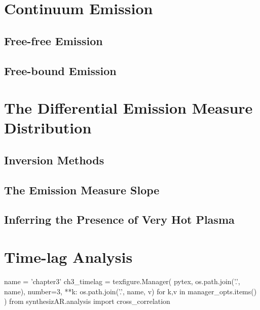 \section{Continuum Emission}\label{sec:continuum}


\subsection{Free-free Emission}

\subsection{Free-bound Emission}

\section{The Differential Emission Measure Distribution}\label{sec:dem}


\subsection{Inversion Methods}

\subsection{The Emission Measure Slope}

\subsection{Inferring the Presence of Very Hot Plasma}

\section{Time-lag Analysis}\label{sec:timelag}

\begin{pycode}
name = 'chapter3'
ch3_timelag = texfigure.Manager(
    pytex,
    os.path.join('.', name),
    number=3,
    **{k: os.path.join('.', name, v) for k,v in manager_opts.items()}
)
from synthesizAR.analysis import cross_correlation
\end{pycode}

